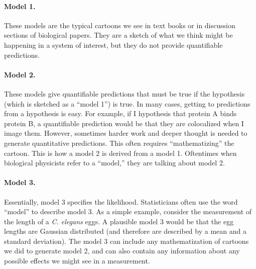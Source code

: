 \paragraph{Model 1.}  These models are the typical cartoons we see in
text books or in discussion sections of biological papers.  They are a
sketch of what we think might be happening in a system of interest,
but they do not provide quantifiable predictions.

\paragraph{Model 2.} These models give quantifiable predictions that
must be true if the hypothesis (which is sketched as a ``model 1'') is
true. In many cases, getting to predictions from a hypothesis is easy.
For example, if I hypothesis that protein A binds protein B, a
quantifiable prediction would be that they are colocalized when I
image them.  However, sometimes harder work and deeper thought is
needed to generate quantitative predictions.  This often requires
``mathematizing'' the cartoon.  This is how a model 2 is derived from
a model 1.  Oftentimes when biological physicists refer to a
``model,'' they are talking about model 2.

\paragraph{Model 3.} Essentially, model 3 specifies the likelihood.
Statisticians often use the word ``model'' to describe model 3.  As a
simple example, consider the measurement of the length of a
\textit{C. elegans} eggs.  A plausible model 3 would be that the egg
lengths are Gaussian distributed (and therefore are described by a
mean and a standard deviation).  The model 3 can include any
mathematization of cartoons we did to generate model 2, and can also
contain any information about any possible effects we might see in a
measurement.


